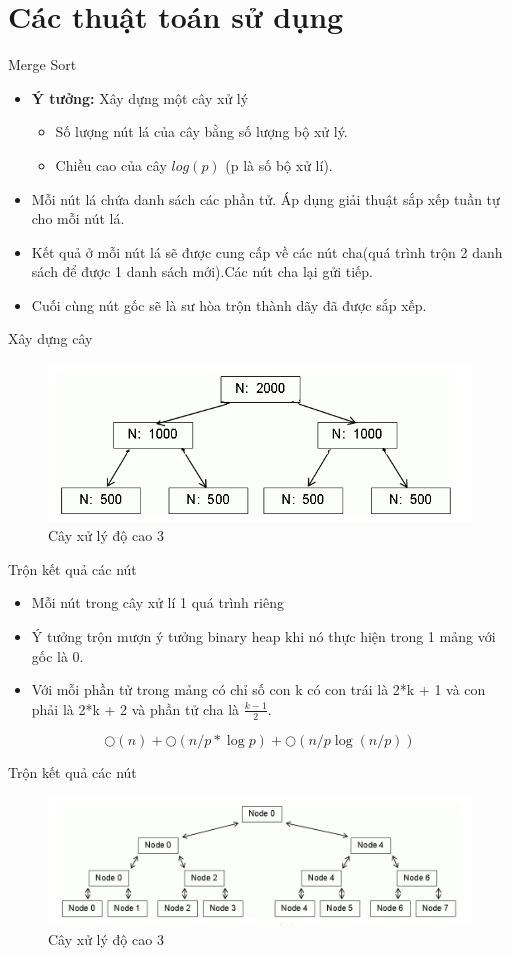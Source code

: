 \documentclass{beamer}
\newcommand{\bi}{\begin{itemize}}
\newcommand{\ei}{\end{itemize}}
\begin{document}
\section{Các thuật toán sử dụng}
\begin{frame}{Merge Sort}
\bi
\item \textbf{Ý tưởng:} Xây dựng một cây xử lý
\bi
\item Số lượng nút lá của cây bằng số lượng bộ xử lý.
\item Chiều cao của cây $log(p)$ (p là số bộ xử lí).
\ei
\item Mỗi nút lá chứa danh sách các phần tử. Áp dụng giải thuật sắp xếp tuần tự cho mỗi nút lá.
\item Kết quả ở mỗi nút lá sẽ được cung cấp về các nút cha(quá trình trộn 2 danh sách để được 1 danh sách mới).Các nút cha lại gửi tiếp.
\item Cuối cùng nút gốc sẽ là sư hòa trộn thành dãy đã được sắp xếp.
\ei
\end{frame}
\begin{frame}{Xây dựng cây}
\begin{figure}[H]
\includegraphics[scale=0.6]{img1.png}
\caption{Cây xử lý độ cao 3}
\end{figure}
\end{frame}
\begin{frame}{Trộn kết quả các nút}
\bi
\item Mỗi nút trong cây xử lí 1 quá trình riêng
\item Ý tưởng trộn mượn ý tưởng binary heap khi nó thực hiện trong 1 mảng với gốc là 0.
\item Với mỗi phần tử trong mảng có chỉ số con k có con trái là 2*k + 1 và con phải là 2*k + 2 và phần tử cha là $\frac{k-1}{2}$.
\ei
$$\bigcirc(n)+\bigcirc(n/p*\log p)+\bigcirc(n/p \log (n/p))$$
\end{frame}
\begin{frame}{Trộn kết quả các nút}
\begin{figure}[H]
\includegraphics[scale=0.4]{img2.png}
\caption{Cây xử lý độ cao 3}
\end{figure}
\end{frame}
\end{document}
